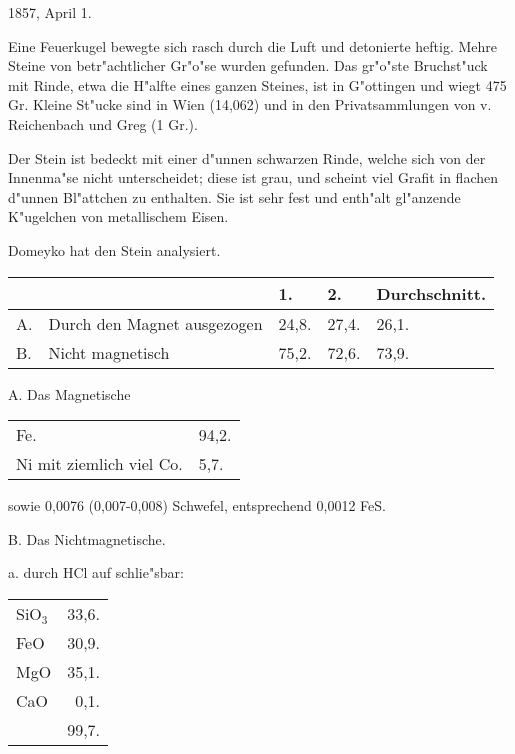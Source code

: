 \documentclass[a4paper, 11pt, oneside]{article}
\begin{document}
1857, April 1.

Eine Feuerkugel bewegte sich rasch durch die Luft und detonierte heftig. Mehre Steine von betr"achtlicher Gr"o"se wurden gefunden. Das gr"o"ste Bruchst"uck mit Rinde, etwa die H"alfte eines ganzen Steines, ist in G"ottingen und wiegt 475 Gr. Kleine St"ucke sind in Wien (14,062) und in den Privatsammlungen von v. Reichenbach und Greg (1 Gr.).

Der Stein ist bedeckt mit einer d"unnen schwarzen Rinde, welche sich von der Innenma"se nicht unterscheidet; diese ist grau, und scheint viel Grafit in flachen d"unnen Bl"attchen zu enthalten. Sie ist sehr fest und enth"alt gl"anzende K"ugelchen von metallischem Eisen.

Domeyko hat den Stein analysiert.

\begin{table}[H]
    \centering\swabfamily\Large
    \begin{tabular}{l l l l l}
        ~ & ~ & 1. & 2. & Durchschnitt. \\ \hline
        A. & Durch den Magnet ausgezogen  & 24,8. & 27,4. & 26,1. \\
        B. & Nicht magnetisch & 75,2. & 72,6. & 73,9. \\
    \end{tabular}
\end{table}

\begin{center}
A. Das Magnetische
\end{center}

\begin{table}[H]
    \centering\swabfamily\Large
    \begin{tabular}{l l}
        Fe. & 94,2. \\
        Ni mit ziemlich viel Co. & 5,7.\\ 
    \end{tabular}
\end{table}

sowie 0,0076 (0,007-0,008) Schwefel, entsprechend 0,0012 FeS.

\begin{center}
B. Das Nichtmagnetische.
\end{center}

\begin{center}
a. durch HCl auf schlie"sbar:
\end{center}

\begin{table}[H]
    \centering\swabfamily\Large
    \begin{tabular}{l r}
        SiO$_{3}$ & 33,6. \\
        FeO & 30,9. \\
        MgO & 35,1. \\
        CaO & 0,1. \\
        ~ & 99,7. \\
    \end{tabular}
\end{table}
\end{document}
